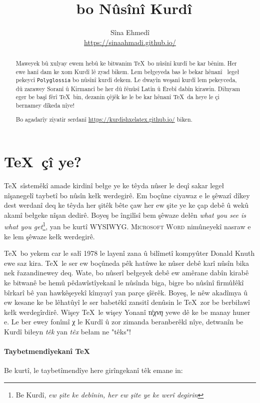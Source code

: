 \documentclass[14pt]{article}
\title{\XeLaTeX~bo Nûsînî Kurdî}
\author{Sîna Ehmedî \\ {\small \url{https://sinaahmadi.github.io/}}}
\date{\ontoday}
\begin{document}
\maketitle
\tableofcontents

\begin{abstract}

Maweyek bû xulyay ewem hebû ke bitwanim \TeX~bo nûsînî kurdî be kar bênim. Her ewe hanî dam ke xom Kurdî lê zyad bikem. Lem bełgeyeda bas le bekar hênanî \XeLaTeX~legeł pekeycî \texttt{Polyglossia} bo nûsînî kurdî dekem. Le dwayîn weşanî kurdî lem pekeyceda, dû zarawey Soranî û Kirmancî be her dû řênûsî Latîn û Ërebî dabîn kirawin. Diłnyam eger be başî fêrî \TeX~bin, dezanin çêjêk ke le be kar hênanî \TeX~da heye le çi bernamey dîkeda nîye!

Bo agadarîy ziyatir serdanî \url{https://kurdishxelatex.github.io/} biken.
\end{abstract}


\section{\TeX~çî ye?}

\TeX~sîstemêkî amade kirdinî bełge ye ke têyda nûser le deqî sakar legeł nîşanegelî taybetî bo nûsîn kełk werdegirê. Em boçûne ciyawaz e le şêwazî dîkey dest werdanî deq ke têyda her şitêk bête çaw her ew şite ye ke çap debê û wekû akamî bełgeke nîşan dedirê. Boyeş be îngilîsî bem şêwaze dełên \textit{what you see is what you get}\footnote{Be Kurdî, \textit{ew şite ke debînin, her ew şite ye ke werî degirin}}, yan be kurtî \textsc{WYSIWYG}. \textsc{Microsoft Word} nimûneyekî nasraw e ke lem şêwaze kełk werdegirê.

\TeX~bo yekem car le sałî 1978 le layenî zana û bilîmetî kompyûter Donald Knuth ewe saz kira. \TeX~le ser ew boçûneda pêk hatûwe ke nûser debê karî nûsîn bika nek řazandinewey deq. Wate, bo nûserî bełgeyek debê ew amêrane dabîn kirabê ke bitwanê be hemû pêdawîstîyekanî le nûsînda biga, bigre bo nûsînî firmûłêkî bîrkarî bê yan hawkêşeyekî kîmyayî yan parçe şîërêk. Boyeş, le nêw akadîmya û ew kesane ke be lêhatûyî le ser babetêkî zansitî denûsin le \TeX~zor be berbiławî kełk werdegîrdirê. Wişey \TeX~le wişey Yonanî \textgreek{\textit{τέχνη}} yewe dê ke be manay huner e. Le ber ewey fonîmî \textgreek{χ} le Kurdî û zor zimanda beranberêkî nîye, detwanîn be Kurdî biłeyn \textit{têk} yan \textit{têx} bełam ne "têks"!

\paragraph{Taybetmendîyekanî \TeX}
Be kurtî, le taybetîmendîye here girîngekanî têk emane in:
 
\end{document}
